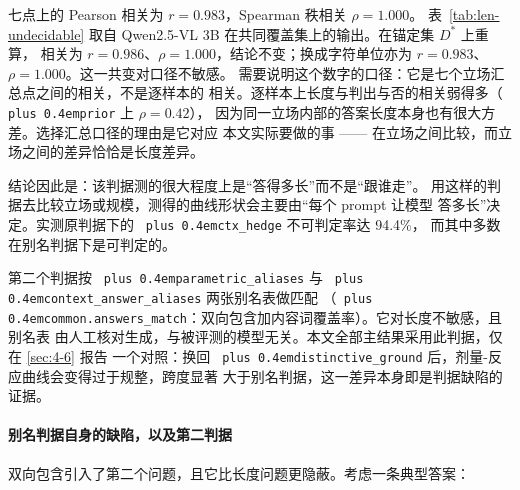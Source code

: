 \documentclass[10.5pt,compsoc,UTF8]{CjC}
\theoremstyle{mystyle}
\DeclareRobustCommand{\code}[1]{\texttt{\spaceskip=0pt plus 0.4em\relax#1}}
\DeclareRobustCommand{\codesplit}[1]{\texttt{\spaceskip=0pt plus 0.4em\relax#1}}
\begin{document}
七点上的 Pearson 相关为 $r = 0.983$，Spearman 秩相关 $\rho = 1.000$。
表~\ref{tab:len-undecidable} 取自 Qwen2.5-VL 3B 在共同覆盖集上的输出。在锚定集 $D^*$ 上重算，
相关为 $r = 0.986$、$\rho = 1.000$，结论不变；换成字符单位亦为 $r = 0.983$、
$\rho = 1.000$。这一共变对口径不敏感。
需要说明这个数字的口径：它是七个立场汇总点之间的相关，不是逐样本的
相关。逐样本上长度与判出与否的相关弱得多（\code{prior} 上 $\rho = 0.42$），
因为同一立场内部的答案长度本身也有很大方差。选择汇总口径的理由是它对应
本文实际要做的事 —— 在立场之间比较，而立场之间的差异恰恰是长度差异。

结论因此是：该判据测的很大程度上是“答得多长”而不是“跟谁走”。
用这样的判据去比较立场或规模，测得的曲线形状会主要由“每个 prompt 让模型
答多长”决定。实测原判据下的 \code{ctx\_hedge} 不可判定率达 94.4\%，
而其中多数在别名判据下是可判定的。

第二个判据按 \codesplit{p\allowbreak{}a\allowbreak{}r\allowbreak{}a\allowbreak{}m\allowbreak{}e\allowbreak{}t\allowbreak{}r\allowbreak{}i\allowbreak{}c\allowbreak{}\_a\allowbreak{}l\allowbreak{}i\allowbreak{}a\allowbreak{}s\allowbreak{}e\allowbreak{}s\allowbreak{}} 与 \codesplit{c\allowbreak{}o\allowbreak{}n\allowbreak{}t\allowbreak{}e\allowbreak{}x\allowbreak{}t\allowbreak{}\_a\allowbreak{}n\allowbreak{}s\allowbreak{}w\allowbreak{}e\allowbreak{}r\allowbreak{}\_a\allowbreak{}l\allowbreak{}i\allowbreak{}a\allowbreak{}s\allowbreak{}e\allowbreak{}s\allowbreak{}} 两张别名表做匹配
（\codesplit{c\allowbreak{}o\allowbreak{}m\allowbreak{}m\allowbreak{}o\allowbreak{}n\allowbreak{}.\allowbreak{}a\allowbreak{}n\allowbreak{}s\allowbreak{}w\allowbreak{}e\allowbreak{}r\allowbreak{}s\allowbreak{}\_m\allowbreak{}a\allowbreak{}t\allowbreak{}c\allowbreak{}h\allowbreak{}}：双向包含加内容词覆盖率）。它对长度不敏感，且别名表
由人工核对生成，与被评测的模型无关。本文全部主结果采用此判据，仅在 \ref{sec:4-6} 报告
一个对照：换回 \codesplit{d\allowbreak{}i\allowbreak{}s\allowbreak{}t\allowbreak{}i\allowbreak{}n\allowbreak{}c\allowbreak{}t\allowbreak{}i\allowbreak{}v\allowbreak{}e\allowbreak{}\_g\allowbreak{}r\allowbreak{}o\allowbreak{}u\allowbreak{}n\allowbreak{}d\allowbreak{}} 后，剂量-反应曲线会变得过于规整，跨度显著
大于别名判据，这一差异本身即是判据缺陷的证据。

\paragraph{别名判据自身的缺陷，以及第二判据}
\label{sec:4-2-1-1}

双向包含引入了第二个问题，且它比长度问题更隐蔽。考虑一条典型答案：
\end{document}
